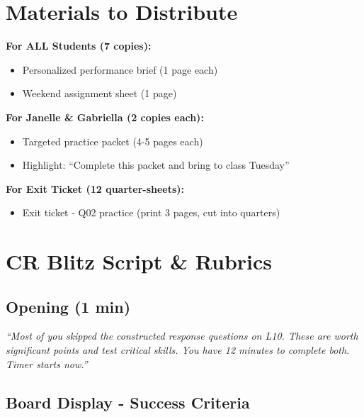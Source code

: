 \documentclass[11pt]{article}
\begin{document}
\vspace{0.15in}

\section*{Materials to Distribute}

\begin{tcolorbox}[colback=blue!5!white,colframe=blue!75!black,title=\textbf{Handout Checklist}]

\textbf{For ALL Students (7 copies):}
\begin{itemize}[label=$\square$,leftmargin=*]
    \item Personalized performance brief (1 page each)
    \item Weekend assignment sheet (1 page)
\end{itemize}

\textbf{For Janelle \& Gabriella (2 copies each):}
\begin{itemize}[label=$\square$,leftmargin=*]
    \item Targeted practice packet (4-5 pages each)
    \item Highlight: ``Complete this packet and bring to class Tuesday''
\end{itemize}

\textbf{For Exit Ticket (12 quarter-sheets):}
\begin{itemize}[label=$\square$,leftmargin=*]
    \item Exit ticket - Q02 practice (print 3 pages, cut into quarters)
\end{itemize}

\end{tcolorbox}

\vspace{0.15in}

\section*{CR Blitz Script \& Rubrics}

\subsection*{Opening (1 min)}

\textit{``Most of you skipped the constructed response questions on L10. These are worth significant points and test critical skills. You have 12 minutes to complete both. Timer starts now.''}

\subsection*{Board Display - Success Criteria}
\end{document}
